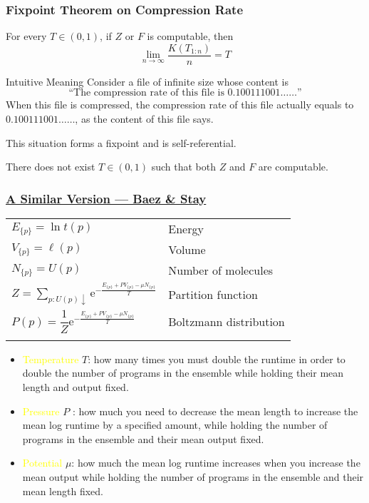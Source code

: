 \documentclass[UTF8,11pt,colorlinks,compress,openany]{beamer}%
\begin{document}
\begin{frame}\frametitle{Fixpoint Theorem on Compression Rate}
\begin{theorem}
For every $T\in(0,1)$, if $Z$ or $F$ is computable, then
\[\lim\limits_{n\to\infty}\frac{K(T_{1:n})}{n}=T\]
\end{theorem}
\begin{block}{Intuitive Meaning}
Consider a file of infinite size whose content is
\[\mbox{``The compression rate of this file is $0.100111001\dots\dots$''}\]
When this file is compressed, the compression rate of this file actually equals to $0.100111001\dots\dots$, as the content of this file says.\\
\centerline{This situation forms a fixpoint and is self-referential.}	
\end{block}
\begin{theorem}
There does not exist $T\in(0,1)$ such that both $Z$ and $F$ are computable.
\end{theorem}
\end{frame}

\begin{frame}\frametitle{\href{https://arxiv.org/abs/1010.2067}{A Similar Version --- Baez \& Stay}}
\begin{table}\renewcommand\arraystretch{1.8}
\begin{tabu}{ll}
\Xhline{1pt}
$E_{\{p\}}=\ln t(p)$ & Energy\\
$V_{\{p\}}=\ell(p)$ & Volume\\
$N_{\{p\}}=U(p)$ & Number of molecules\\
$Z=\sum\limits_{p:U(p)\downarrow} \mathrm{e}^{-\frac{E_{\{p\}}+PV_{\{p\}}-\mu N_{\{p\}}}{T}}$ & Partition function \\
$P(p)=\dfrac{1}{Z}\mathrm{e}^{-\frac{E_{\{p\}}+PV_{\{p\}}-\mu N_{\{p\}}}{T}}$ & Boltzmann distribution \\
\Xhline{1pt}
\end{tabu}
\end{table}
{\footnotesize
\begin{itemize}
	\item \textcolor{yellow}{Temperature} $T$: how many times you must double the runtime in order to double the number of programs in the ensemble while holding their mean length and output fixed.
	\item \textcolor{yellow}{Pressure} $P$ : how much you need to decrease the mean length to increase the mean log runtime by a specified amount, while holding the number of programs in the ensemble and their mean output fixed.
	\item \textcolor{yellow}{Potential} $\mu$: how much the mean log runtime increases when you increase the mean output while holding the number of programs in the ensemble and their mean length fixed.
\end{itemize}}
\end{frame}
\end{document}
